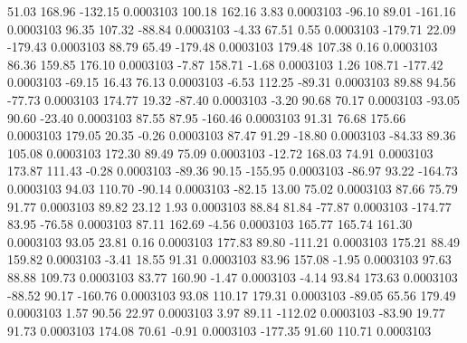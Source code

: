        51.03      168.96     -132.15     0.0003103
      100.18      162.16        3.83     0.0003103
      -96.10       89.01     -161.16     0.0003103
       96.35      107.32      -88.84     0.0003103
       -4.33       67.51        0.55     0.0003103
     -179.71       22.09     -179.43     0.0003103
       88.79       65.49     -179.48     0.0003103
      179.48      107.38        0.16     0.0003103
       86.36      159.85      176.10     0.0003103
       -7.87      158.71       -1.68     0.0003103
        1.26      108.71     -177.42     0.0003103
      -69.15       16.43       76.13     0.0003103
       -6.53      112.25      -89.31     0.0003103
       89.88       94.56      -77.73     0.0003103
      174.77       19.32      -87.40     0.0003103
       -3.20       90.68       70.17     0.0003103
      -93.05       90.60      -23.40     0.0003103
       87.55       87.95     -160.46     0.0003103
       91.31       76.68      175.66     0.0003103
      179.05       20.35       -0.26     0.0003103
       87.47       91.29      -18.80     0.0003103
      -84.33       89.36      105.08     0.0003103
      172.30       89.49       75.09     0.0003103
      -12.72      168.03       74.91     0.0003103
      173.87      111.43       -0.28     0.0003103
      -89.36       90.15     -155.95     0.0003103
      -86.97       93.22     -164.73     0.0003103
       94.03      110.70      -90.14     0.0003103
      -82.15       13.00       75.02     0.0003103
       87.66       75.79       91.77     0.0003103
       89.82       23.12        1.93     0.0003103
       88.84       81.84      -77.87     0.0003103
     -174.77       83.95      -76.58     0.0003103
       87.11      162.69       -4.56     0.0003103
      165.77      165.74      161.30     0.0003103
       93.05       23.81        0.16     0.0003103
      177.83       89.80     -111.21     0.0003103
      175.21       88.49      159.82     0.0003103
       -3.41       18.55       91.31     0.0003103
       83.96      157.08       -1.95     0.0003103
       97.63       88.88      109.73     0.0003103
       83.77      160.90       -1.47     0.0003103
       -4.14       93.84      173.63     0.0003103
      -88.52       90.17     -160.76     0.0003103
       93.08      110.17      179.31     0.0003103
      -89.05       65.56      179.49     0.0003103
        1.57       90.56       22.97     0.0003103
        3.97       89.11     -112.02     0.0003103
      -83.90       19.77       91.73     0.0003103
      174.08       70.61       -0.91     0.0003103
     -177.35       91.60      110.71     0.0003103
